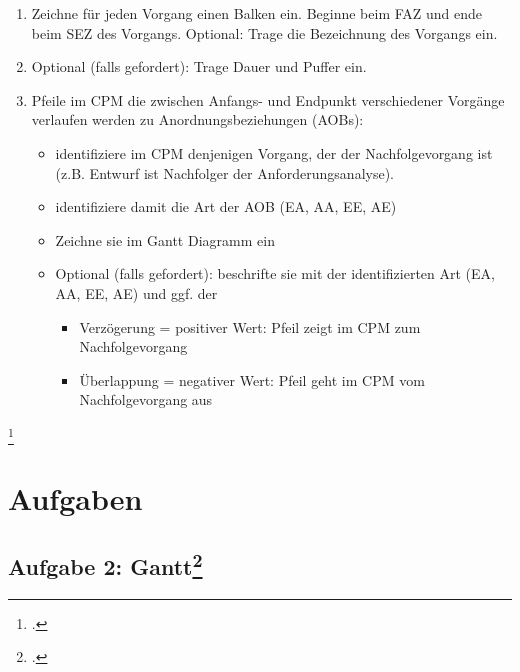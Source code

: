 \documentclass{lehramt-informatik}
\begin{document}
\begin{enumerate}
\item Zeichne für jeden Vorgang einen Balken ein. Beginne beim FAZ und
ende beim SEZ des Vorgangs. Optional: Trage die Bezeichnung des Vorgangs
ein.

\item Optional (falls gefordert): Trage Dauer und Puffer ein.

\item Pfeile im CPM die zwischen Anfangs- und Endpunkt verschiedener
Vorgänge verlaufen werden zu Anordnungsbeziehungen (AOBs):

\begin{itemize}
\item identifiziere im CPM denjenigen Vorgang, der der Nachfolgevorgang
ist (z.B. Entwurf ist Nachfolger der Anforderungsanalyse).

\item identifiziere damit die Art der AOB (EA, AA, EE, AE)

\item Zeichne sie im Gantt Diagramm ein

\item Optional (falls gefordert): beschrifte sie mit der identifizierten
Art (EA, AA, EE, AE) und ggf. der

\begin{itemize}
\item Verzögerung = positiver Wert: Pfeil zeigt im CPM zum
Nachfolgevorgang

\item Überlappung = negativer Wert: Pfeil geht im CPM vom
Nachfolgevorgang aus
\end{itemize}
\end{itemize}
\end{enumerate}

\footcite[Seite 36]{sosy:fs:3}


\chapter{Aufgaben}

%

\section{Aufgabe 2: Gantt\footcite[Seite 1]{sosy:ab:5}}
\end{document}
